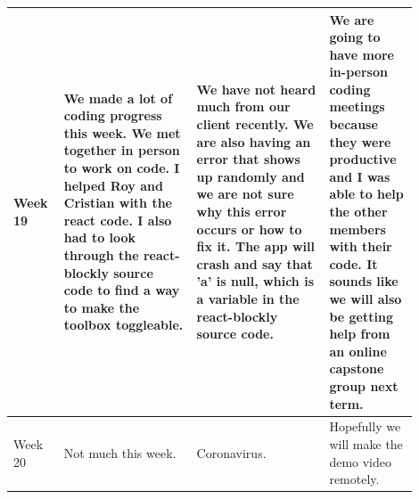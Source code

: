 \documentclass[draftclsnofoot,10pt,onecolumn]{IEEEtran}
\begin{document}
\begin{longtable}{p{0.1\linewidth}p{0.3\linewidth}p{0.3\linewidth}p{0.2\linewidth}}
            \hline
            Week 19
             & We made a lot of coding progress this week. We met together in person to work on code. I helped Roy and Cristian with the react code. I also had to look through the react-blockly source code to find a way to make the toolbox toggleable.
             & We have not heard much from our client recently. We are also having an error that shows up randomly and we are not sure why this error occurs or how to fix it. The app will crash and say that 'a' is null, which is a variable in the react-blockly source code.
             & We are going to have more in-person coding meetings because they were productive and I was able to help the other members with their code. It sounds like we will also be getting help from an online capstone group next term.\\
            \hline
            Week 20
             & Not much this week.
             & Coronavirus.
             & Hopefully we will make the demo video remotely.\\
            \hline
    \end{longtable}
\newpage
\end{document}
